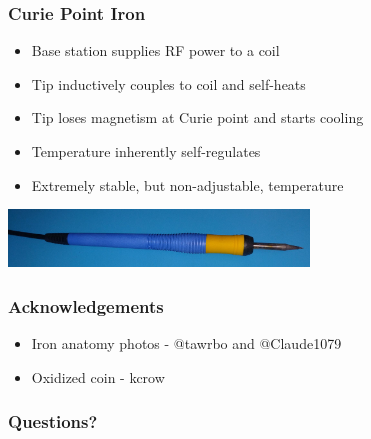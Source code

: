 \documentclass{beamer}
\begin{document}
\begin{frame}
\frametitle{Curie Point Iron}
\begin{itemize}
\item Base station supplies RF power to a coil
\item Tip inductively couples to coil and self-heats
\item Tip loses magnetism at Curie point and starts cooling
\item Temperature inherently self-regulates
\item Extremely stable, but non-adjustable, temperature
\end{itemize}
\begin{center}
\includegraphics[width=8cm,keepaspectratio]{curie-iron.jpg}
\end{center}
\end{frame}

\begin{frame}
\frametitle{Acknowledgements}
\begin{itemize}
\item Iron anatomy photos - @tawrbo and @Claude1079
\item Oxidized coin - kcrow
\end{itemize}
\end{frame}

\begin{frame}
\frametitle{Questions?}
\end{frame}
\end{document}
